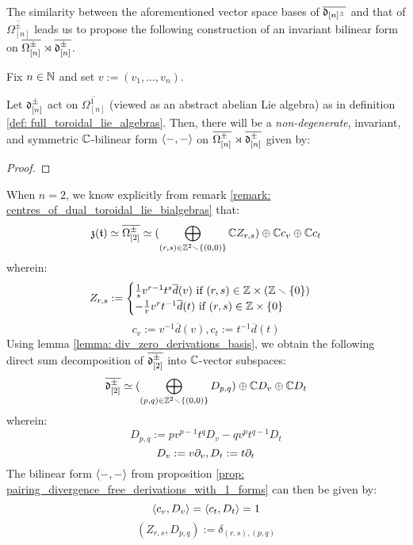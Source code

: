             The similarity between the aforementioned vector space bases of $\overline{\mathfrak{d}_{[n]^{\pm}}}$ and that of $\overline{\Omega_{[n]}^{\pm}}$ leads us to propose the following construction of an invariant bilinear form on $\overline{\Omega^{\pm}_{[n]}} \rtimes \overline{\mathfrak{d}_{[n]}^{\pm}}$.
            \begin{proposition} \label{prop: pairing_divergence_free_derivations_with_1_forms}
                Fix $n \in \mathbb{N}$ and set $v := (v_1, ..., v_n)$. 
            
                Let $\mathfrak{d}_{[n]}^{\pm}$ act on $\overline{\Omega^1_{[n]}}$ (viewed as an abstract abelian Lie algebra) as in definition \ref{def: full_toroidal_lie_algebras}. Then, there will be a \textit{non-degenerate}, invariant, and symmetric $\mathbb{C}$-bilinear form $\langle-, -\rangle$ on $\overline{\Omega^{\pm}_{[n]}} \rtimes \overline{\mathfrak{d}_{[n]}^{\pm}}$ given by:
                    $$$$
            \end{proposition}
                \begin{proof}
                    
                \end{proof}
            \begin{example}
                When $n = 2$, we know explicitly from remark \ref{remark: centres_of_dual_toroidal_lie_bialgebras} that:
                    $$\mathfrak{z}(\mathfrak{t}) \simeq \overline{\Omega_{[2]}^{\pm}} \simeq ( \bigoplus_{(r, s) \in \mathbb{Z}^2 \smallsetminus \{(0, 0)\}} \mathbb{C} Z_{r, s} ) \oplus \mathbb{C} c_v \oplus \mathbb{C} c_t$$
                wherein:
                    $$
                        Z_{r, s} :=
                        \begin{cases}
                            \text{$\frac1s v^{r - 1} t^s \overline{d}(v)$ if $(r, s) \in \Z \x (\Z \setminus \{0\})$}
                            \\
                            \text{$-\frac1r v^r t^{-1} \overline{d}(t)$ if $(r, s) \in \Z \x \{0\}$}
                        \end{cases}
                    $$
                    $$c_v := v^{-1} \overline{d}(v), c_t := t^{-1} \overline{d}(t)$$
                Using lemma \ref{lemma: div_zero_derivations_basis}, we obtain the following direct sum decomposition of $\overline{\mathfrak{d}_{[2]}^{\pm}}$ into $\mathbb{C}$-vector subspaces:
                    $$\overline{\mathfrak{d}_{[2]}^{\pm}} \simeq ( \bigoplus_{(p, q) \in \mathbb{Z}^2 \smallsetminus \{(0, 0)\}} D_{p, q} ) \oplus \mathbb{C} D_v \oplus \mathbb{C} D_t$$
                wherein:
                    $$D_{p, q} := p v^{p - 1} t^q D_v - q v^p t^{q - 1} D_t$$
                    $$D_v := v \partial_v, D_t := t \partial_t$$
                The bilinear form $\langle-, -\rangle$ from proposition \ref{prop: pairing_divergence_free_derivations_with_1_forms} can then be given by:
                    $$\langle c_v, D_v\rangle = \langle c_t, D_t\rangle = 1$$
                    $$( Z_{r, s}, D_{p, q} ) := \delta_{(r, s), (p, q)}$$
            \end{example}
                
